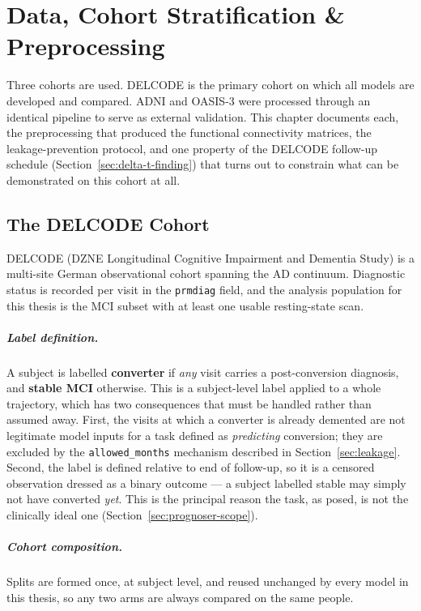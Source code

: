 \chapter{Data, Cohort Stratification \& Preprocessing}
\label{ch:data}

Three cohorts are used. DELCODE is the primary cohort on which all models are developed and
compared. ADNI and OASIS-3 were processed through an identical pipeline to serve as external
validation. This chapter documents each, the preprocessing that produced the functional
connectivity matrices, the leakage-prevention protocol, and one property of the DELCODE
follow-up schedule (Section~\ref{sec:delta-t-finding}) that turns out to constrain what can
be demonstrated on this cohort at all.

\section{The DELCODE Cohort}
\label{sec:delcode}

DELCODE (DZNE Longitudinal Cognitive Impairment and Dementia Study) is a multi-site German
observational cohort spanning the AD continuum. Diagnostic status is recorded per visit in
the \texttt{prmdiag} field, and the analysis population for this thesis is the MCI subset
with at least one usable resting-state scan.

\paragraph{Label definition.} A subject is labelled \textbf{converter} if \emph{any} visit
carries a post-conversion diagnosis, and \textbf{stable MCI} otherwise. This is a
subject-level label applied to a whole trajectory, which has two consequences that must be
handled rather than assumed away. First, the visits at which a converter is already demented
are not legitimate model inputs for a task defined as \emph{predicting} conversion; they are
excluded by the \texttt{allowed\_months} mechanism described in
Section~\ref{sec:leakage}. Second, the label is defined relative to end of follow-up, so it
is a censored observation dressed as a binary outcome --- a subject labelled stable may
simply not have converted \emph{yet}. This is the principal reason the task, as posed, is
not the clinically ideal one (Section~\ref{sec:prognoser-scope}).

\paragraph{Cohort composition.} Splits are formed once, at subject level, and reused
unchanged by every model in this thesis, so any two arms are always compared on the
same people.

